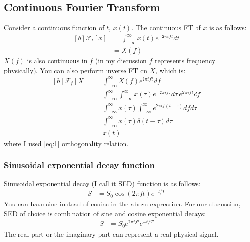 \documentclass[letterpaper, 11pt]{article}
\newcommand{\fourier}[2]{\mathcal{F}_{#1}[#2]}
\newcommand{\fint}{\int_{-\infty}^{\infty}}
\numberwithin{equation}{section}
\begin{document}
\subsection{Continuous Fourier Transform}
Consider a continuous function of \(t\), \(x(t)\). The continuous FT of \(x\) is as follows:
\begin{equation}
	\begin{aligned}[b]
		\fourier{t}{x}	&= \fint x(t)e^{-2\pi ift} dt \\
				&= X(f)
	\end{aligned}
\end{equation}
\(X(f)\) is also continuous in \(f\) (in my discussion \(f\) represents frequency physically). You can also perform inverse FT on \(X\), which is:
\begin{equation}
	\begin{aligned}[b]
		\fourier{f}{X}	&= \fint X(f)e^{2\pi ift} df \\
				&= \fint \fint x(\tau)e^{-2\pi if\tau} d\tau\ e^{2\pi ift} df \\
				&= \fint x(\tau) \fint e^{2\pi if(t - \tau)} df d\tau \\
				&= \fint x(\tau) \delta (t - \tau) d\tau \\
				&= x(t)
	\end{aligned}
\end{equation}
where I used \eqref{eq:1} orthogonality relation.

\subsubsection{Sinusoidal exponential decay function}
Sinusoidal exponential decay (I call it SED) function is as follows:
\begin{align}
	S &= S_{0}\cos{(2\pi ft)}e^{-t/T}
\end{align}
You can have sine instead of cosine in the above expression. For our discussion, SED of choice is combination of sine and cosine exponential decays:
\begin{align}
	S &= S_{0}e^{2\pi ift}e^{-t/T}
\end{align}
The real part or the imaginary part can represent a real physical signal.
\printindex
\end{document}
